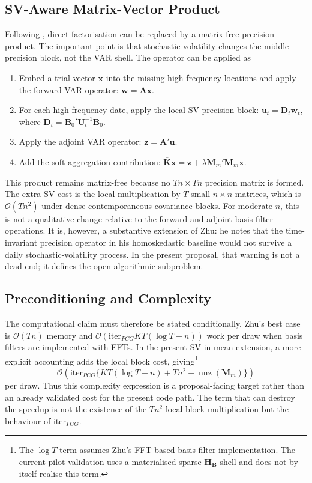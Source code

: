 \documentclass[12pt]{article}
\begin{document}
\subsection{SV-Aware Matrix-Vector Product}
Following \citet{zhu2026structural}, direct factorisation can be replaced by a matrix-free precision product. The important point is that stochastic volatility changes the middle precision block, not the VAR shell. The operator can be applied as
\begin{enumerate}
    \item Embed a trial vector $\mathbf{x}$ into the missing high-frequency locations and apply the forward VAR operator: $\mathbf{w}=\mathbf{A}\mathbf{x}$.
    \item For each high-frequency date, apply the local SV precision block: $\mathbf{u}_t=\mathbf{D}_t\mathbf{w}_t$, where $\mathbf{D}_t=\mathbf{B}_0'\mathbf{U}_t^{-1}\mathbf{B}_0$.
    \item Apply the adjoint VAR operator: $\mathbf{z}=\mathbf{A}'\mathbf{u}$.
    \item Add the soft-aggregation contribution: $\overline{\mathbf{K}}\mathbf{x}=\mathbf{z}+\lambda\mathbf{M}_m'\mathbf{M}_m\mathbf{x}$.
\end{enumerate}
This product remains matrix-free because no $Tn\times Tn$ precision matrix is formed. The extra SV cost is the local multiplication by $T$ small $n\times n$ matrices, which is $\mathcal{O}(Tn^2)$ under dense contemporaneous covariance blocks. For moderate $n$, this is not a qualitative change relative to the forward and adjoint basis-filter operations. It is, however, a substantive extension of Zhu: he notes that the time-invariant precision operator in his homoskedastic baseline would not survive a daily stochastic-volatility process. In the present proposal, that warning is not a dead end; it defines the open algorithmic subproblem.

\subsection{Preconditioning and Complexity}
The computational claim must therefore be stated conditionally. Zhu's best case is $\mathcal{O}(Tn)$ memory and $\mathcal{O}(\text{iter}_{PCG}KT(\log T+n))$ work per draw when basis filters are implemented with FFTs. In the present SV-in-mean extension, a more explicit accounting adds the local block cost, giving\footnote{The $\log T$ term assumes Zhu's FFT-based basis-filter implementation. The current pilot validation uses a materialised sparse $\mathbf{H}_{\mathbf{B}}$ shell and does not by itself realise this term.}
\begin{equation}
    \mathcal{O}\left(\text{iter}_{PCG}\{KT(\log T+n)+Tn^2+\operatorname{nnz}(\mathbf{M}_m)\}\right)
\end{equation}
per draw. Thus this complexity expression is a proposal-facing target rather than an already validated cost for the present code path. The term that can destroy the speedup is not the existence of the $Tn^2$ local block multiplication but the behaviour of $\text{iter}_{PCG}$.
\end{document}
